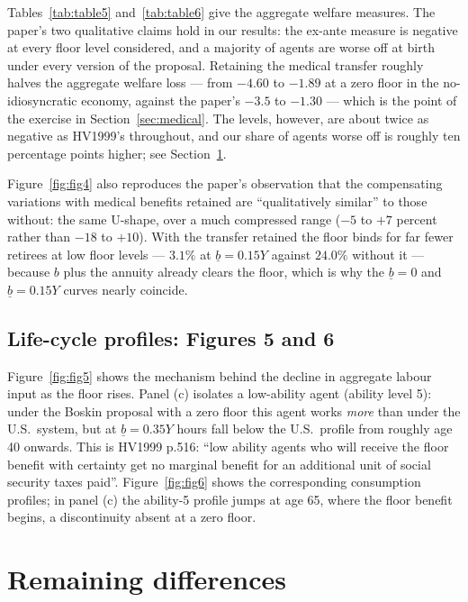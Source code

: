 \documentclass[11pt,fleqn]{article}
\begin{document}
Tables~\ref{tab:table5} and~\ref{tab:table6} give the aggregate welfare measures. The paper's
two qualitative claims hold in our results: the ex-ante measure is negative at every floor
level considered, and a majority of agents are worse off at birth under every version of the
proposal. Retaining the medical transfer roughly halves the aggregate welfare loss --- from
$-4.60$ to $-1.89$ at a zero floor in the no-idiosyncratic economy, against the paper's
$-3.5$ to $-1.30$ --- which is the point of the exercise in Section~\ref{sec:medical}. The
levels, however, are about twice as negative as HV1999's throughout, and our share of agents
worse off is roughly ten percentage points higher; see Section~\ref{sec:discrep}.

Figure~\ref{fig:fig4} also reproduces the paper's observation that the compensating variations
with medical benefits retained are ``qualitatively similar'' to those without: the same
U-shape, over a much compressed range ($-5$ to $+7$ percent rather than $-18$ to $+10$). With
the transfer retained the floor binds for far fewer retirees at low floor levels --- $3.1\%$
at $\underline{b}=0.15Y$ against $24.0\%$ without it --- because $b$ plus the annuity already
clears the floor, which is why the $\underline{b}=0$ and $\underline{b}=0.15Y$ curves nearly
coincide.

\subsection*{Life-cycle profiles: Figures 5 and 6}

Figure~\ref{fig:fig5} shows the mechanism behind the decline in aggregate labour input as the
floor rises. Panel (c) isolates a low-ability agent (ability level 5): under the Boskin
proposal with a zero floor this agent works \emph{more} than under the U.S.\ system, but at
$\underline{b}=0.35Y$ hours fall below the U.S.\ profile from roughly age 40 onwards. This is
HV1999 p.516: ``low ability agents who will receive the floor benefit with certainty get no
marginal benefit for an additional unit of social security taxes paid''. Figure~\ref{fig:fig6}
shows the corresponding consumption profiles; in panel (c) the ability-5 profile jumps at age
65, where the floor benefit begins, a discontinuity absent at a zero floor.

\section{Remaining differences}\label{sec:discrep}
\end{document}
